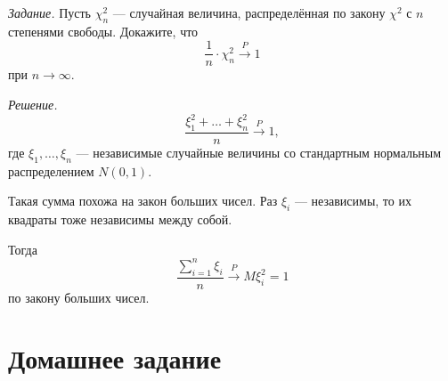 \textit{Задание.}
Пусть $ \chi_n^2$ --- случайная величина,
распределённая по закону $ \chi^2$ с $n$ степенями свободы.
Докажите, что
$$ \frac{1}{n} \cdot \chi_n^2 \overset{P}{ \rightarrow}
  1$$
при $n \to \infty $.

\textit{Решение.}
$$ \frac{ \xi_1^2 + \dotsc + \xi_n^2}{n} \overset{P}{ \rightarrow }
  1,$$
где $ \xi_1, \dotsc, \xi_n$ ---
независимые случайные величины со стандартным нормальным распределением $N \left( 0, 1 \right) $.

Такая сумма похожа на закон больших чисел.
Раз $ \xi_i$ --- независимы, то их квадраты тоже независимы между собой.

Тогда
$$ \frac{ \sum \limits_{i = 1}^n  \xi_i}{n} \overset{P}{ \rightarrow }
  M \xi_i^2 =
  1$$
по закону больших чисел.

\section*{Домашнее задание}
